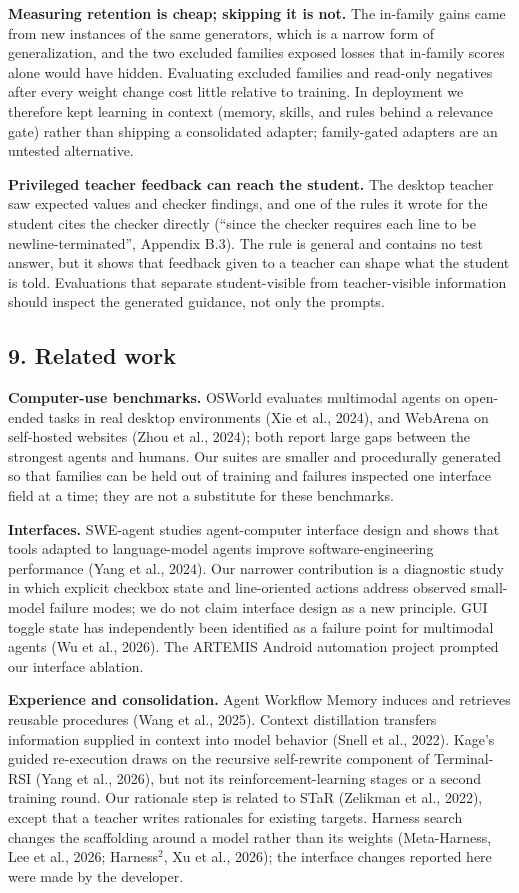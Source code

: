 \documentclass[
  10pt,
]{article}
\begin{document}
\textbf{Measuring retention is cheap; skipping it is not.} The in-family
gains came from new instances of the same generators, which is a narrow
form of generalization, and the two excluded families exposed losses
that in-family scores alone would have hidden. Evaluating excluded
families and read-only negatives after every weight change cost little
relative to training. In deployment we therefore kept learning in
context (memory, skills, and rules behind a relevance gate) rather than
shipping a consolidated adapter; family-gated adapters are an untested
alternative.

\textbf{Privileged teacher feedback can reach the student.} The desktop
teacher saw expected values and checker findings, and one of the rules
it wrote for the student cites the checker directly (``since the checker
requires each line to be newline-terminated'', Appendix B.3). The rule
is general and contains no test answer, but it shows that feedback given
to a teacher can shape what the student is told. Evaluations that
separate student-visible from teacher-visible information should inspect
the generated guidance, not only the prompts.

\subsection{9. Related work}\label{related-work}

\textbf{Computer-use benchmarks.} OSWorld evaluates multimodal agents on
open-ended tasks in real desktop environments (Xie et al., 2024), and
WebArena on self-hosted websites (Zhou et al., 2024); both report large
gaps between the strongest agents and humans. Our suites are smaller and
procedurally generated so that families can be held out of training and
failures inspected one interface field at a time; they are not a
substitute for these benchmarks.

\textbf{Interfaces.} SWE-agent studies agent-computer interface design
and shows that tools adapted to language-model agents improve
software-engineering performance (Yang et al., 2024). Our narrower
contribution is a diagnostic study in which explicit checkbox state and
line-oriented actions address observed small-model failure modes; we do
not claim interface design as a new principle. GUI toggle state has
independently been identified as a failure point for multimodal agents
(Wu et al., 2026). The ARTEMIS Android automation project prompted our
interface ablation.

\textbf{Experience and consolidation.} Agent Workflow Memory induces and
retrieves reusable procedures (Wang et al., 2025). Context distillation
transfers information supplied in context into model behavior (Snell et
al., 2022). Kage's guided re-execution draws on the recursive
self-rewrite component of Terminal-RSI (Yang et al., 2026), but not its
reinforcement-learning stages or a second training round. Our rationale
step is related to STaR (Zelikman et al., 2022), except that a teacher
writes rationales for existing targets. Harness search changes the
scaffolding around a model rather than its weights (Meta-Harness, Lee et
al., 2026; Harness\(^2\), Xu et al., 2026); the interface changes
reported here were made by the developer.
\end{document}
